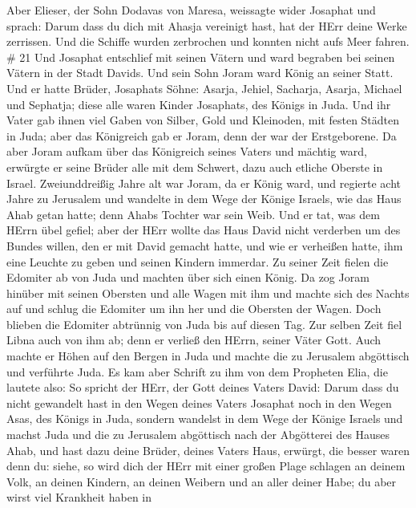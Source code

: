  Aber Elieser, der Sohn Dodavas von Maresa, weissagte wider
Josaphat und sprach: Darum dass du dich mit Ahasja vereinigt hast, hat
der HErr deine Werke zerrissen. Und die Schiffe wurden zerbrochen und
konnten nicht aufs Meer fahren. \# 21  Und Josaphat
entschlief mit seinen Vätern und ward begraben bei seinen Vätern in der
Stadt Davids. Und sein Sohn Joram ward König an seiner Statt.
 Und er hatte Brüder, Josaphats Söhne: Asarja, Jehiel,
Sacharja, Asarja, Michael und Sephatja; diese alle waren Kinder
Josaphats, des Königs in Juda.  Und ihr Vater gab ihnen viel
Gaben von Silber, Gold und Kleinoden, mit festen Städten in Juda; aber
das Königreich gab er Joram, denn der war der Erstgeborene. 
Da aber Joram aufkam über das Königreich seines Vaters und mächtig ward,
erwürgte er seine Brüder alle mit dem Schwert, dazu auch etliche Oberste
in Israel.  Zweiunddreißig Jahre alt war Joram, da er König
ward, und regierte acht Jahre zu Jerusalem  und wandelte in
dem Wege der Könige Israels, wie das Haus Ahab getan hatte; denn Ahabs
Tochter war sein Weib. Und er tat, was dem HErrn übel gefiel;
 aber der HErr wollte das Haus David nicht verderben um des
Bundes willen, den er mit David gemacht hatte, und wie er verheißen
hatte, ihm eine Leuchte zu geben und seinen Kindern immerdar.
 Zu seiner Zeit fielen die Edomiter ab von Juda und machten
über sich einen König.  Da zog Joram hinüber mit seinen
Obersten und alle Wagen mit ihm und machte sich des Nachts auf und
schlug die Edomiter um ihn her und die Obersten der Wagen. 
Doch blieben die Edomiter abtrünnig von Juda bis auf diesen Tag. Zur
selben Zeit fiel Libna auch von ihm ab; denn er verließ den HErrn,
seiner Väter Gott.  Auch machte er Höhen auf den Bergen in
Juda und machte die zu Jerusalem abgöttisch und verführte Juda.
 Es kam aber Schrift zu ihm von dem Propheten Elia, die
lautete also: So spricht der HErr, der Gott deines Vaters David: Darum
dass du nicht gewandelt hast in den Wegen deines Vaters Josaphat noch in
den Wegen Asas, des Königs in Juda,  sondern wandelst in
dem Wege der Könige Israels und machst Juda und die zu Jerusalem
abgöttisch nach der Abgötterei des Hauses Ahab, und hast dazu deine
Brüder, deines Vaters Haus, erwürgt, die besser waren denn du:
 siehe, so wird dich der HErr mit einer großen Plage
schlagen an deinem Volk, an deinen Kindern, an deinen Weibern und an
aller deiner Habe;  du aber wirst viel Krankheit haben in
